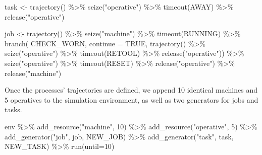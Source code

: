 \documentclass[
]{book}
\newenvironment{Shaded}{\begin{snugshade}}{\end{snugshade}}
\newcommand{\AttributeTok}[1]{\textcolor[rgb]{0.77,0.63,0.00}{#1}}
\newcommand{\ConstantTok}[1]{\textcolor[rgb]{0.00,0.00,0.00}{#1}}
\newcommand{\DecValTok}[1]{\textcolor[rgb]{0.00,0.00,0.81}{#1}}
\newcommand{\FunctionTok}[1]{\textcolor[rgb]{0.00,0.00,0.00}{#1}}
\newcommand{\NormalTok}[1]{#1}
\newcommand{\OtherTok}[1]{\textcolor[rgb]{0.56,0.35,0.01}{#1}}
\newcommand{\SpecialCharTok}[1]{\textcolor[rgb]{0.00,0.00,0.00}{#1}}
\newcommand{\StringTok}[1]{\textcolor[rgb]{0.31,0.60,0.02}{#1}}
\begin{document}
\begin{Shaded}
\begin{Highlighting}[]
\NormalTok{task }\OtherTok{\textless{}{-}} \FunctionTok{trajectory}\NormalTok{() }\SpecialCharTok{\%\textgreater{}\%}
  \FunctionTok{seize}\NormalTok{(}\StringTok{"operative"}\NormalTok{) }\SpecialCharTok{\%\textgreater{}\%}
  \FunctionTok{timeout}\NormalTok{(AWAY) }\SpecialCharTok{\%\textgreater{}\%}
  \FunctionTok{release}\NormalTok{(}\StringTok{"operative"}\NormalTok{)}

\NormalTok{job }\OtherTok{\textless{}{-}} \FunctionTok{trajectory}\NormalTok{() }\SpecialCharTok{\%\textgreater{}\%}
  \FunctionTok{seize}\NormalTok{(}\StringTok{"machine"}\NormalTok{) }\SpecialCharTok{\%\textgreater{}\%}
  \FunctionTok{timeout}\NormalTok{(RUNNING) }\SpecialCharTok{\%\textgreater{}\%}
  \FunctionTok{branch}\NormalTok{(}
\NormalTok{   CHECK\_WORN, }\AttributeTok{continue =} \ConstantTok{TRUE}\NormalTok{,}
   \FunctionTok{trajectory}\NormalTok{() }\SpecialCharTok{\%\textgreater{}\%}
   \FunctionTok{seize}\NormalTok{(}\StringTok{"operative"}\NormalTok{) }\SpecialCharTok{\%\textgreater{}\%}
   \FunctionTok{timeout}\NormalTok{(RETOOL) }\SpecialCharTok{\%\textgreater{}\%}
   \FunctionTok{release}\NormalTok{(}\StringTok{"operative"}\NormalTok{)) }\SpecialCharTok{\%\textgreater{}\%}
  \FunctionTok{seize}\NormalTok{(}\StringTok{"operative"}\NormalTok{) }\SpecialCharTok{\%\textgreater{}\%}
  \FunctionTok{timeout}\NormalTok{(RESET) }\SpecialCharTok{\%\textgreater{}\%}
  \FunctionTok{release}\NormalTok{(}\StringTok{"operative"}\NormalTok{) }\SpecialCharTok{\%\textgreater{}\%}
  \FunctionTok{release}\NormalTok{(}\StringTok{"machine"}\NormalTok{)}
\end{Highlighting}
\end{Shaded}

Once the processes' trajectories are defined, we append 10 identical machines and 5 operatives
to the simulation environment, as well as two generators for jobs and tasks.

\begin{Shaded}
\begin{Highlighting}[]
\NormalTok{env }\SpecialCharTok{\%\textgreater{}\%}
  \FunctionTok{add\_resource}\NormalTok{(}\StringTok{"machine"}\NormalTok{, }\DecValTok{10}\NormalTok{) }\SpecialCharTok{\%\textgreater{}\%}
  \FunctionTok{add\_resource}\NormalTok{(}\StringTok{"operative"}\NormalTok{, }\DecValTok{5}\NormalTok{) }\SpecialCharTok{\%\textgreater{}\%}
  \FunctionTok{add\_generator}\NormalTok{(}\StringTok{"job"}\NormalTok{, job, NEW\_JOB) }\SpecialCharTok{\%\textgreater{}\%}
  \FunctionTok{add\_generator}\NormalTok{(}\StringTok{"task"}\NormalTok{, task, NEW\_TASK) }\SpecialCharTok{\%\textgreater{}\%}
  \FunctionTok{run}\NormalTok{(}\AttributeTok{until=}\DecValTok{10}\NormalTok{)}
\end{Highlighting}
\end{Shaded}
\end{document}
